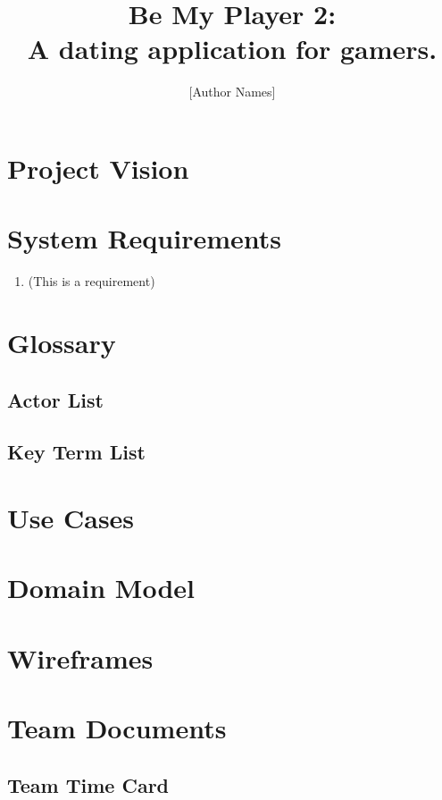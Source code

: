 \documentclass[12pt, draft]{article}
\title{Be My Player 2: \\ A dating application for gamers.}
\author{[Author Names]}
\begin{document}
\maketitle \pagebreak



\section{Project Vision}

\section{System Requirements}
\begin{enumerate}
\item (This is a requirement)
\end{enumerate}

\section{Glossary}
\subsection{Actor List}

\subsection{Key Term List}

\section{Use Cases}


\section{Domain Model}

\section{Wireframes}

\section{Team Documents}
\subsection{Team Time Card}
\end{document}
